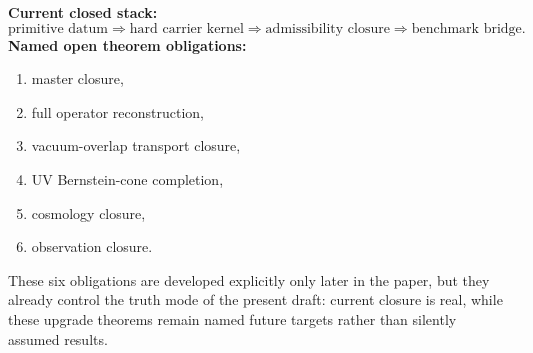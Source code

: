 \begin{tcolorbox}[colback=orange!4, colframe=orange!65!black, breakable,
    title={\textbf{Current closed stack and named open theorem obligations}}, fonttitle=\bfseries]
\textbf{Current closed stack:}
\[
\text{primitive datum}
\Longrightarrow
\text{hard carrier kernel}
\Longrightarrow
\text{admissibility closure}
\Longrightarrow
\text{benchmark bridge}.
\]
\textbf{Named open theorem obligations:}
\begin{enumerate}[label=\textbf{O\arabic*:}, leftmargin=1.7em, topsep=3pt, itemsep=2pt]
    \item master closure,
    \item full operator reconstruction,
    \item vacuum-overlap transport closure,
    \item UV Bernstein-cone completion,
    \item cosmology closure,
    \item observation closure.
\end{enumerate}
These six obligations are developed explicitly only later in the paper, but they already control the truth mode of the present draft: current closure is real, while these upgrade theorems remain named future targets rather than silently assumed results.
\end{tcolorbox}

